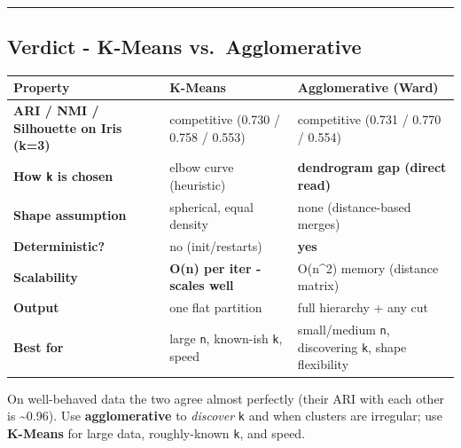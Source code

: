\documentclass[11pt]{article}
\begin{document}
    \begin{center}
    \end{center}
    { \hspace*{\fill} \\}
    
    \begin{center}\rule{0.5\linewidth}{0.5pt}\end{center}

\subsection{Verdict - K-Means
vs.~Agglomerative}\label{verdict---k-means-vs.-agglomerative}

{\def\LTcaptype{none} %
\begin{longtable}[]{@{}
  >{\raggedright\arraybackslash}p{}
  >{\raggedright\arraybackslash}p{}
  >{\raggedright\arraybackslash}p{}@{}}
\toprule\noalign{}
\begin{minipage}[b]{\linewidth}\raggedright
Property
\end{minipage} & \begin{minipage}[b]{\linewidth}\raggedright
K-Means
\end{minipage} & \begin{minipage}[b]{\linewidth}\raggedright
Agglomerative (Ward)
\end{minipage} \\
\midrule\noalign{}
\endhead
\bottomrule\noalign{}
\endlastfoot
\textbf{ARI / NMI / Silhouette on Iris (k=3)} & competitive (0.730 /
0.758 / 0.553) & competitive (0.731 / 0.770 / 0.554) \\
\textbf{How \texttt{k} is chosen} & elbow curve (heuristic) &
\textbf{dendrogram gap (direct read)} \\
\textbf{Shape assumption} & spherical, equal density & none
(distance-based merges) \\
\textbf{Deterministic?} & no (init/restarts) & \textbf{yes} \\
\textbf{Scalability} & \textbf{O(n) per iter - scales well} & O(n\^{}2)
memory (distance matrix) \\
\textbf{Output} & one flat partition & full hierarchy + any cut \\
\textbf{Best for} & large \texttt{n}, known-ish \texttt{k}, speed &
small/medium \texttt{n}, discovering \texttt{k}, shape flexibility \\
\end{longtable}
}

On well-behaved data the two agree almost perfectly (their ARI with each
other is \textasciitilde0.96). Use \textbf{agglomerative} to
\emph{discover} \texttt{k} and when clusters are irregular; use
\textbf{K-Means} for large data, roughly-known \texttt{k}, and speed.


    
    
    
\end{document}
